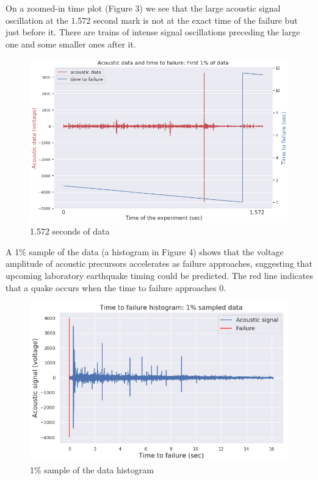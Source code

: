 \documentclass[]{llncs} %
\begin{document}
On a zoomed-in time plot (Figure 3) we see that the large acoustic signal oscillation at the 1.572 second mark is not at the exact time of the failure but just before it. There are trains of intense signal oscillations preceding the large one and some smaller ones after it.\par
\begin{figure}
	\centering
	\includegraphics[width=.9\linewidth]{zoomedInTimePLot}
	\caption{1.572 seconds of data}
	\label{fig:zoomeInTimePlot}
\end{figure}

 A 1\% sample of the data (a histogram in Figure 4) shows that the voltage amplitude of acoustic precursors accelerates as failure approaches, suggesting that upcoming laboratory earthquake timing could be predicted. The red line indicates that a quake occurs when the time to failure approaches 0. \par
\begin{figure}
	\centering
	\includegraphics[width=.8\linewidth]{timeToFailureHistogram}
	\caption{1\% sample of the data histogram}
	\label{fig:timeToFailureHistogram}
\end{figure}
\end{document}
